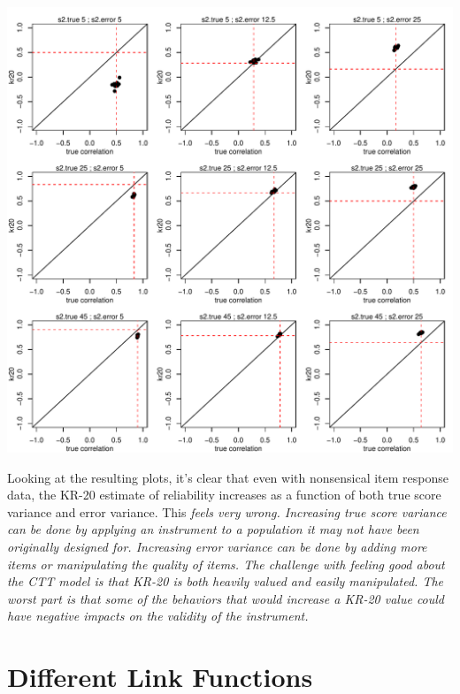 \documentclass{article}\usepackage[]{graphicx}\usepackage[]{color}
\makeatletter
\def\maxwidth{ %
  \ifdim\Gin@nat@width>\linewidth
    \linewidth
  \else
    \Gin@nat@width
  \fi
}
\newenvironment{knitrout}{}{} %
\makeatother
\begin{document}
\begin{knitrout}
\color{fgcolor}
\includegraphics[width=\maxwidth]{figure/unnamed-chunk-3-1} 

\end{knitrout}

Looking at the resulting plots, it's clear that even with nonsensical item response data, the KR-20 estimate of reliability increases as a function of both true score variance and error variance.  This \em feels \em very wrong.  Increasing true score variance can be done by applying an instrument to a population it may not have been originally designed for.  Increasing error variance can be done by adding more items or manipulating the quality of items.  The challenge with feeling good about the CTT model is that KR-20 is both heavily valued and easily manipulated.  The worst part is that some of the behaviors that would increase a KR-20 value could have negative impacts on the validity of the instrument.

\pagebreak
\section{Different Link Functions}
\end{document}
